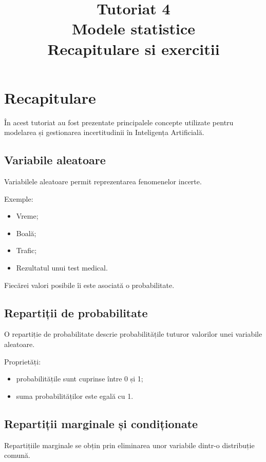 \documentclass[12pt,a4paper]{article}
\title{Tutoriat 4\\Modele statistice\\Recapitulare si exercitii}
\author{}
\date{}
\begin{document}
\maketitle

\section{Recapitulare}

În acest tutoriat au fost prezentate principalele concepte utilizate pentru modelarea și gestionarea incertitudinii în Inteligența Artificială.

\subsection{Variabile aleatoare}

Variabilele aleatoare permit reprezentarea fenomenelor incerte.

Exemple:

\begin{itemize}
\item Vreme;
\item Boală;
\item Trafic;
\item Rezultatul unui test medical.
\end{itemize}

Fiecărei valori posibile îi este asociată o probabilitate.

\subsection{Repartiții de probabilitate}

O repartiție de probabilitate descrie probabilitățile tuturor valorilor unei variabile aleatoare.

Proprietăți:

\begin{itemize}
\item probabilitățile sunt cuprinse între 0 și 1;
\item suma probabilităților este egală cu 1.
\end{itemize}

\subsection{Repartiții marginale și condiționate}

Repartițiile marginale se obțin prin eliminarea unor variabile dintr-o distribuție comună.
\end{document}
